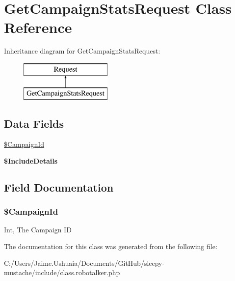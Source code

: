 \hypertarget{class_get_campaign_stats_request}{\section{Get\-Campaign\-Stats\-Request Class Reference}
\label{class_get_campaign_stats_request}
}
Inheritance diagram for Get\-Campaign\-Stats\-Request\-:\begin{figure}[H]
\begin{center}
\leavevmode
\includegraphics[height=2.000000cm]{class_get_campaign_stats_request}
\end{center}
\end{figure}
\subsection*{Data Fields}
\begin{DoxyCompactItemize}
\item 
\hyperlink{class_get_campaign_stats_request_a2d22a3b5dcd66a7b8cc5db60947b5ca3}{\$\-Campaign\-Id}
\item 
\hypertarget{class_get_campaign_stats_request_a6a7dc0605d9a2e10066aeb57b77fc272}{{\bfseries \$\-Include\-Details}}\label{class_get_campaign_stats_request_a6a7dc0605d9a2e10066aeb57b77fc272}

\end{DoxyCompactItemize}


\subsection{Field Documentation}
\hypertarget{class_get_campaign_stats_request_a2d22a3b5dcd66a7b8cc5db60947b5ca3}{
\subsubsection[{\$\-Campaign\-Id}]{\setlength{\rightskip}{0pt plus 5cm}\$Campaign\-Id}}\label{class_get_campaign_stats_request_a2d22a3b5dcd66a7b8cc5db60947b5ca3}
Int, The Campaign I\-D 

The documentation for this class was generated from the following file\-:\begin{DoxyCompactItemize}
\item 
C\-:/\-Users/\-Jaime.\-Ushuaia/\-Documents/\-Git\-Hub/sleepy-\/mustache/include/class.\-robotalker.\-php\end{DoxyCompactItemize}
